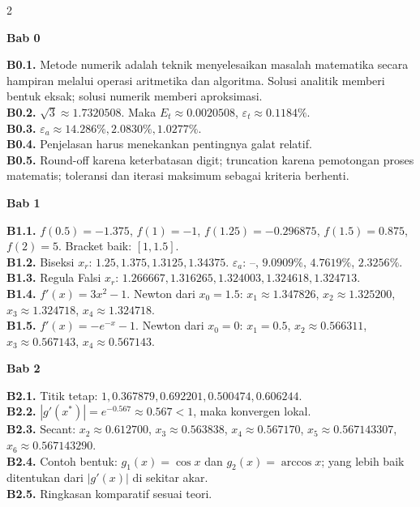 \documentclass[10pt,a4paper]{article}
\begin{document}
\begin{multicols}{2}

\begin{chapterbox}{\color{white}\bfseries Bab 0}\end{chapterbox}
\textbf{B0.1.} Metode numerik adalah teknik menyelesaikan masalah matematika secara hampiran melalui operasi aritmetika dan algoritma. Solusi analitik memberi bentuk eksak; solusi numerik memberi aproksimasi.\\
\textbf{B0.2.} \(\sqrt{3}\approx1.7320508\). Maka \(E_t\approx0.0020508\), \(\varepsilon_t\approx0.1184\%\).\\
\textbf{B0.3.} \(\varepsilon_a\approx14.286\%,2.0830\%,1.0277\%\).\\
\textbf{B0.4.} Penjelasan harus menekankan pentingnya galat relatif.\\
\textbf{B0.5.} Round-off karena keterbatasan digit; truncation karena pemotongan proses matematis; toleransi dan iterasi maksimum sebagai kriteria berhenti.

\begin{chapterbox}{\color{white}\bfseries Bab 1}\end{chapterbox}
\textbf{B1.1.} \(f(0.5)=-1.375\), \(f(1)=-1\), \(f(1.25)=-0.296875\), \(f(1.5)=0.875\), \(f(2)=5\). Bracket baik: \([1,1.5]\).\\
\textbf{B1.2.} Biseksi \(x_r\): \(1.25,1.375,1.3125,1.34375\). \(\varepsilon_a\): --, \(9.0909\%\), \(4.7619\%\), \(2.3256\%\).\\
\textbf{B1.3.} Regula Falsi \(x_r\): \(1.266667,1.316265,1.324003,1.324618,1.324713\).\\
\textbf{B1.4.} \(f'(x)=3x^2-1\). Newton dari \(x_0=1.5\): \(x_1\approx1.347826\), \(x_2\approx1.325200\), \(x_3\approx1.324718\), \(x_4\approx1.324718\).\\
\textbf{B1.5.} \(f'(x)=-e^{-x}-1\). Newton dari \(x_0=0\): \(x_1=0.5\), \(x_2\approx0.566311\), \(x_3\approx0.567143\), \(x_4\approx0.567143\).

\begin{chapterbox}{\color{white}\bfseries Bab 2}\end{chapterbox}
\textbf{B2.1.} Titik tetap: \(1,0.367879,0.692201,0.500474,0.606244\).\\
\textbf{B2.2.} \(|g'(x^\ast)|=e^{-0.567}\approx0.567<1\), maka konvergen lokal.\\
\textbf{B2.3.} Secant: \(x_2\approx0.612700\), \(x_3\approx0.563838\), \(x_4\approx0.567170\), \(x_5\approx0.567143307\), \(x_6\approx0.567143290\).\\
\textbf{B2.4.} Contoh bentuk: \(g_1(x)=\cos x\) dan \(g_2(x)=\arccos x\); yang lebih baik ditentukan dari \(|g'(x)|\) di sekitar akar.\\
\textbf{B2.5.} Ringkasan komparatif sesuai teori.


\end{multicols}
\end{document}

